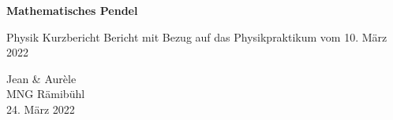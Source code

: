 \begin{titlepage}
    \begin{center}
        \vspace*{1cm}
        \Huge
        \textbf{Mathematisches Pendel}
 
        \vspace{0.5cm}
        \LARGE
        Physik Kurzbericht
        \vfill
        \normalsize
        Bericht mit Bezug auf das Physikpraktikum vom 10. März 2022  
        \vspace{0.3cm}
      
        Jean \& Aurèle\\
        MNG Rämibühl\\
        24. März 2022
             
    \end{center}
 \end{titlepage}